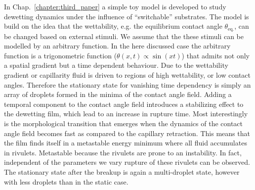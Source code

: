 In Chap.~\ref{chapter:third_paper} a simple toy model is developed to study dewetting dynamics under the influence of ``switchable'' substrates.
The model is build on the idea that the wettability, e.g. the equilibrium contact angle $\theta_{\text{eq.}}$, can be changed based on external stimuli. We assume that the these stimuli can be modelled by an arbitrary function.
In the here discussed case the arbitrary function is a trigonometric function ($\theta(x,t) \propto \sin(x t)$) that admits not only a spatial gradient but a time dependent behaviour.
Due to the wettability gradient or capillarity fluid is driven to regions of high wettability, or low contact angles.
Therefore the stationary state for vanishing time dependency is simply an array of droplets formed in the minima of the contact angle field.
Adding a temporal component to the contact angle field introduces a stabilizing effect to the dewetting film, which lead to an increase in rupture time.
Most interestingly is the morphological transition that emerges when the dynamics of the contact angle field becomes fast as compared to the capillary retraction.
This means that the film finds itself in a metastable energy minimum where all fluid accumulates in rivulets.
Metastable because the rivulets are prone to an instability. 
In fact, independent of the parameters we vary rupture of these rivulets can be observed. 
The stationary state after the breakup is again a multi-droplet state, however with less droplets than in the static case.


